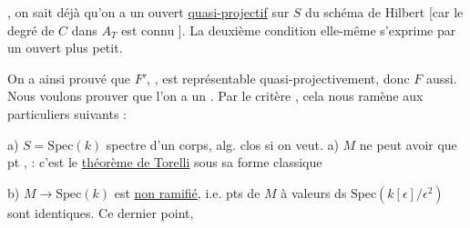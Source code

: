 
, on sait déjà qu'on a  un ouvert \uline{quasi-projectif} sur $S$ du schéma de Hilbert [car le  degré de $C$ dans $A_T$ est connu \unsure{--|- -}].  La deuxième condition elle-même s'exprime par un ouvert plus petit.

On a ainsi prouvé que $F'$, , est représentable quasi-projectivement, donc $F$ aussi. Nous voulons prouver que l'on a un  . Par le critère , cela nous ramène aux  particuliers suivants :

a) $S=\mathrm{Spec}(k)$ spectre d'un corps, alg. clos si on veut. a) \unsure{$\exists$}$M$ ne peut avoir que   pt ,  : c'est le \uline{théorème de Torelli} sous sa forme classique

b)  $M\longrightarrow\mathrm{Spec}(k)$ est \uline{non ramifié}, i.e.   pts de $M$ à valeurs ds $\mathrm{Spec}(k[\epsilon]/\epsilon^2)$   sont identiques.  Ce dernier point,

